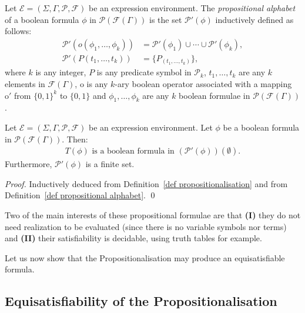 \documentclass[a4paper]{llncs}
\begin{document}
  
  \begin{definition}\label{def propositional alphabet}
    Let $\mathcal{E}=(\Sigma,\Gamma,\mathcal{P},\mathcal{F})$ be an expression environment. The \emph{propositional alphabet} of a boolean formula $\phi$ in $\mathcal{P}(\mathcal{F}(\Gamma))$ is the set $\mathcal{P}'(\phi)$ inductively defined as follows:
        \begin{align*}
        \mathcal{P}'(o(\phi_1,\ldots,\phi_k))&=\mathcal{P}'(\phi_1)\cup\cdots\cup \mathcal{P}'(\phi_k),\\
        \mathcal{P}'(P(t_1,\ldots,t_k))&=\{P_{(t_1,\ldots,t_k)}\},
        \end{align*}
        where $k$ is any integer, $P$ is any predicate symbol in $\mathcal{P}_k$, $t_1,\ldots,t_k$ are any $k$ elements in $\mathcal{F}(\Gamma)$, $\mathrm{o}$ is any $k$-ary boolean operator associated with a mapping $\mathrm{o}'$ from $\{0,1\}^k$ to $\{0,1\}$ and $\phi_1,\ldots,\phi_k$ are any $k$ boolean formulae in $\mathcal{P}(\mathcal{F}(\Gamma))$.
  \end{definition}
  
  \begin{proposition}
    Let $\mathcal{E}=(\Sigma,\Gamma,\mathcal{P},\mathcal{F})$ be an expression environment. Let $\phi$ be a boolean formula in $\mathcal{P}(\mathcal{F}(\Gamma))$. Then:
        \begin{align*}
        T(\phi)\text{ is a boolean formula in }(\mathcal{P}'(\phi))(\emptyset).
        \end{align*}    
    Furthermore, $\mathcal{P}'(\phi)$ is a finite set.
  \end{proposition}
  \begin{proof}
    Inductively deduced from Definition~\ref{def propositionalisation} and from Definition~\ref{def propositional alphabet}.
    \qed
  \end{proof}
  
  Two of the main interests of these propositional formulae are that \textbf{(I)} they do not need realization to be evaluated (since there is no variable symbols nor terms) and \textbf{(II)} their satisfiability is decidable, using truth tables for example.
  
  Let us now show that the Propositionalisation may produce an equisatisfiable formula.
  
  \subsection{Equisatisfiability of the Propositionalisation}
  
\end{document}
